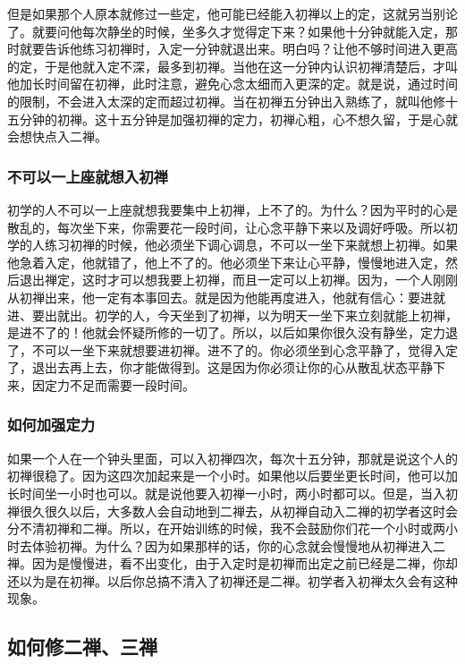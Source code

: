 \documentclass{book}
\begin{document}
但是如果那个人原本就修过一些定，他可能已经能入初禅以上的定，这就另当别论了。就要问他每次静坐的时候，坐多久才觉得定下来？如果他十分钟就能入定，那时就要告诉他练习初禅时，入定一分钟就退出来。明白吗？让他不够时间进入更高的定，于是他就入定不深，最多到初禅。当他在这一分钟内认识初禅清楚后，才叫他加长时间留在初禅，此时注意，避免心念太细而入更深的定。就是说，通过时间的限制，不会进入太深的定而超过初禅。当在初禅五分钟出入熟练了，就叫他修十五分钟的初禅。这十五分钟是加强初禅的定力，初禅心粗，心不想久留，于是心就会想快点入二禅。

\subsubsection{不可以一上座就想入初禅}

初学的人不可以一上座就想我要集中上初禅，上不了的。为什么？因为平时的心是散乱的，每次坐下来，你需要花一段时间，让心念平静下来以及调好呼吸。所以初学的人练习初禅的时候，他必须坐下调心调息，不可以一坐下来就想上初禅。如果他急着入定，他就错了，他上不了的。他必须坐下来让心平静，慢慢地进入定，然后退出禅定，这时才可以想我要上初禅，而且一定可以上初禅。因为，一个人刚刚从初禅出来，他一定有本事回去。就是因为他能再度进入，他就有信心：要进就进、要出就出。初学的人，今天坐到了初禅，以为明天一坐下来立刻就能上初禅，是进不了的！他就会怀疑所修的一切了。所以，以后如果你很久没有静坐，定力退了，不可以一坐下来就想要进初禅。进不了的。你必须坐到心念平静了，觉得入定了，退出去再上去，你才能做得到。这是因为你必须让你的心从散乱状态平静下来，因定力不足而需要一段时间。

\subsubsection{如何加强定力}

如果一个人在一个钟头里面，可以入初禅四次，每次十五分钟，那就是说这个人的初禅很稳了。因为这四次加起来是一个小时。如果他以后要坐更长时间，他可以加长时间坐一小时也可以。就是说他要入初禅一小时，两小时都可以。但是，当入初禅很久很久以后，大多数人会自动地到二禅去，从初禅自动入二禅的初学者这时会分不清初禅和二禅。所以，在开始训练的时候，我不会鼓励你们花一个小时或两小时去体验初禅。为什么？因为如果那样的话，你的心念就会慢慢地从初禅进入二禅。因为是慢慢进，看不出变化，由于入定时是初禅而出定之前已经是二禅，你却还以为是在初禅。以后你总搞不清入了初禅还是二禅。初学者入初禅太久会有这种现象。

\subsection{如何修二禅、三禅}
\end{document}
